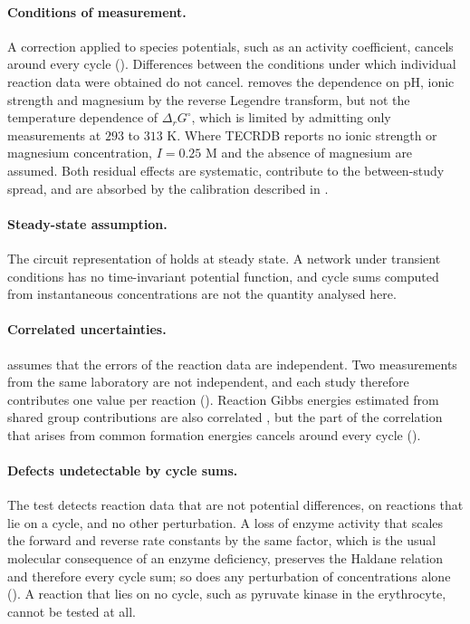 \documentclass[11pt,a4paper]{article}
\theoremstyle{pstyle}
\theoremstyle{definition}
\theoremstyle{remark}
\begin{document}
\paragraph{Conditions of measurement.} A correction applied to species
potentials, such as an activity coefficient, cancels around every cycle
(). Differences between the conditions under
which individual reaction data were obtained do not cancel.
 removes the dependence on pH, ionic strength and
magnesium by the reverse Legendre transform, but not the temperature
dependence of $\Delta_rG^{\circ}$, which is limited by admitting only
measurements at $293$ to $313$ K. Where TECRDB reports no ionic strength
or magnesium concentration, $I=0.25$ M and the absence of magnesium are
assumed. Both residual effects are systematic, contribute to the
between-study spread, and are absorbed by the calibration described in
.

\paragraph{Steady-state assumption.} The circuit representation of
 holds at steady state. A network under transient
conditions has no time-invariant potential function, and cycle sums
computed from instantaneous concentrations are not the quantity analysed
here.

\paragraph{Correlated uncertainties.}  assumes
that the errors of the reaction data are independent. Two measurements
from the same laboratory are not independent, and each study therefore
contributes one value per reaction (). Reaction Gibbs
energies estimated from shared group contributions are also correlated
\citep{noor2013}, but the part of the correlation that arises from
common formation energies cancels around every cycle
().

\paragraph{Defects undetectable by cycle sums.} The test detects
reaction data that are not potential differences, on reactions that lie
on a cycle, and no other perturbation. A loss of enzyme activity that
scales the forward and reverse rate constants by the same factor, which
is the usual molecular consequence of an enzyme deficiency, preserves
the Haldane relation and therefore every cycle sum; so does any
perturbation of concentrations alone (). A
reaction that lies on no cycle, such as pyruvate kinase in the
erythrocyte, cannot be tested at all.
\end{document}
